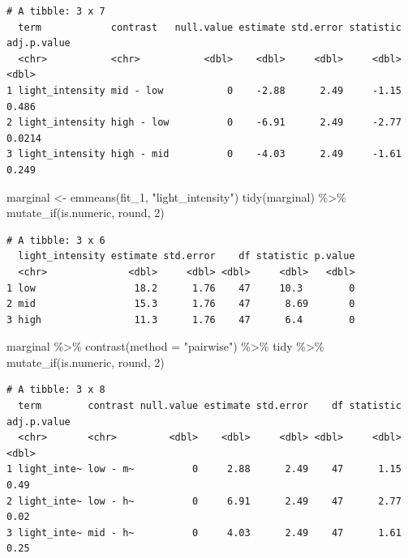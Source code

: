 \documentclass[
  letterpaper,
]{scrbook}
\newenvironment{Shaded}{\begin{snugshade}}{\end{snugshade}}
\newcommand{\AttributeTok}[1]{\textcolor[rgb]{0.40,0.45,0.13}{#1}}
\newcommand{\DecValTok}[1]{\textcolor[rgb]{0.68,0.00,0.00}{#1}}
\newcommand{\FunctionTok}[1]{\textcolor[rgb]{0.28,0.35,0.67}{#1}}
\newcommand{\NormalTok}[1]{\textcolor[rgb]{0.00,0.23,0.31}{#1}}
\newcommand{\OtherTok}[1]{\textcolor[rgb]{0.00,0.23,0.31}{#1}}
\newcommand{\SpecialCharTok}[1]{\textcolor[rgb]{0.37,0.37,0.37}{#1}}
\newcommand{\StringTok}[1]{\textcolor[rgb]{0.13,0.47,0.30}{#1}}
\begin{document}
\begin{verbatim}
# A tibble: 3 x 7
  term            contrast   null.value estimate std.error statistic adj.p.value
  <chr>           <chr>           <dbl>    <dbl>     <dbl>     <dbl>       <dbl>
1 light_intensity mid - low           0    -2.88      2.49     -1.15      0.486 
2 light_intensity high - low          0    -6.91      2.49     -2.77      0.0214
3 light_intensity high - mid          0    -4.03      2.49     -1.61      0.249 
\end{verbatim}

\begin{Shaded}
\begin{Highlighting}[]
\NormalTok{marginal }\OtherTok{\textless{}{-}} \FunctionTok{emmeans}\NormalTok{(fit\_1, }\StringTok{"light\_intensity"}\NormalTok{)}
\FunctionTok{tidy}\NormalTok{(marginal) }\SpecialCharTok{\%\textgreater{}\%} 
  \FunctionTok{mutate\_if}\NormalTok{(is.numeric, round, }\DecValTok{2}\NormalTok{)}
\end{Highlighting}
\end{Shaded}

\begin{verbatim}
# A tibble: 3 x 6
  light_intensity estimate std.error    df statistic p.value
  <chr>              <dbl>     <dbl> <dbl>     <dbl>   <dbl>
1 low                 18.2      1.76    47     10.3        0
2 mid                 15.3      1.76    47      8.69       0
3 high                11.3      1.76    47      6.4        0
\end{verbatim}

\begin{Shaded}
\begin{Highlighting}[]
\NormalTok{marginal }\SpecialCharTok{\%\textgreater{}\%} \FunctionTok{contrast}\NormalTok{(}\AttributeTok{method =} \StringTok{"pairwise"}\NormalTok{) }\SpecialCharTok{\%\textgreater{}\%}\NormalTok{ tidy }\SpecialCharTok{\%\textgreater{}\%} 
  \FunctionTok{mutate\_if}\NormalTok{(is.numeric, round, }\DecValTok{2}\NormalTok{)}
\end{Highlighting}
\end{Shaded}

\begin{verbatim}
# A tibble: 3 x 8
  term        contrast null.value estimate std.error    df statistic adj.p.value
  <chr>       <chr>         <dbl>    <dbl>     <dbl> <dbl>     <dbl>       <dbl>
1 light_inte~ low - m~          0     2.88      2.49    47      1.15        0.49
2 light_inte~ low - h~          0     6.91      2.49    47      2.77        0.02
3 light_inte~ mid - h~          0     4.03      2.49    47      1.61        0.25
\end{verbatim}
\end{document}

